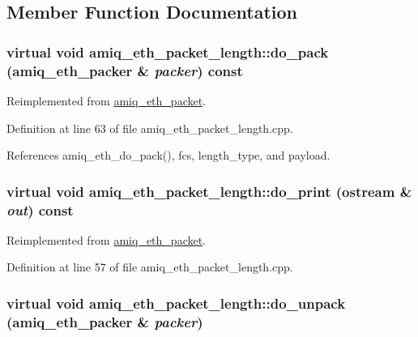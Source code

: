 \subsection{Member Function Documentation}
\hypertarget{classamiq__eth__packet__length_a0e4e4b570a84eda1274ff8f0e76b45df}{
\subsubsection[{do\_\-pack}]{\setlength{\rightskip}{0pt plus 5cm}virtual void amiq\_\-eth\_\-packet\_\-length::do\_\-pack ({\bf amiq\_\-eth\_\-packer} \& {\em packer}) const}}
\label{classamiq__eth__packet__length_a0e4e4b570a84eda1274ff8f0e76b45df}


Reimplemented from \hyperlink{classamiq__eth__packet_ab580d89fb44208f5a0fe31443619473e}{amiq\_\-eth\_\-packet}.

Definition at line 63 of file amiq\_\-eth\_\-packet\_\-length.cpp.

References amiq\_\-eth\_\-do\_\-pack(), fcs, length\_\-type, and payload.\hypertarget{classamiq__eth__packet__length_a2caccb08da11dbb3ab39178bc41bca75}{
\subsubsection[{do\_\-print}]{\setlength{\rightskip}{0pt plus 5cm}virtual void amiq\_\-eth\_\-packet\_\-length::do\_\-print (ostream \& {\em out}) const}}
\label{classamiq__eth__packet__length_a2caccb08da11dbb3ab39178bc41bca75}


Reimplemented from \hyperlink{classamiq__eth__packet_aa179c700ae183f1b884a9222a73fed4e}{amiq\_\-eth\_\-packet}.

Definition at line 57 of file amiq\_\-eth\_\-packet\_\-length.cpp.\hypertarget{classamiq__eth__packet__length_ab496b25828caaf23edd5fa6d4729c578}{
\subsubsection[{do\_\-unpack}]{\setlength{\rightskip}{0pt plus 5cm}virtual void amiq\_\-eth\_\-packet\_\-length::do\_\-unpack ({\bf amiq\_\-eth\_\-packer} \& {\em packer})}}
\label{classamiq__eth__packet__length_ab496b25828caaf23edd5fa6d4729c578}



